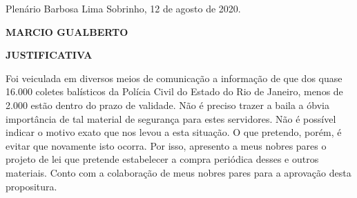 \documentclass[10pt]{article}
\begin{document}
\begin{center}
  Plenário Barbosa Lima Sobrinho, 12 de agosto de 2020.

   \bigskip

  \textbf{ MARCIO GUALBERTO}

  \bigskip

  \textbf{JUSTIFICATIVA}
  \bigskip

\end{center}

  Foi veiculada em diversos meios de comunicação a informação de que dos quase 16.000 coletes balísticos da Polícia Civil do Estado do Rio de Janeiro, menos de 2.000 estão dentro do prazo de validade. Não é preciso trazer a baila a óbvia importância de tal material de segurança para estes servidores. Não é possível indicar o motivo exato que nos levou a esta situação. O que pretendo, porém, é evitar que novamente isto ocorra. Por isso, apresento a meus nobres pares o projeto de lei que pretende estabelecer a compra periódica desses e outros materiais. Conto com a colaboração de meus nobres pares para a aprovação desta propositura.



\iffalse
\begin{center}
  \textbf{REFERÊNCIAS}
\end{center}


\fi
\end{document}
